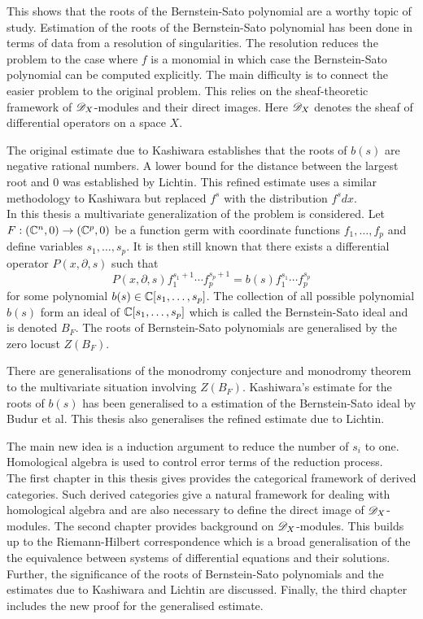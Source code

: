 This shows that the roots of the Bernstein-Sato polynomial are a worthy topic of study.
Estimation of the roots of the Bernstein-Sato polynomial has been done in terms of data from a resolution of singularities.
The resolution reduces the problem to the case where $f$ is a monomial in which case the Bernstein-Sato polynomial can be computed explicitly.
The main difficulty is to connect the easier problem to the original problem.
This relies on the sheaf-theoretic framework of $\mathscr{D}_X$-modules and their direct images.
Here $\mathscr{D}_X$ denotes the sheaf of differential operators on a space $X$.

The original estimate due to Kashiwara establishes that the roots of $b(s)$ are negative rational numbers.
A lower bound for the distance between the largest root and $0$ was established by Lichtin.
This refined estimate uses a similar methodology to Kashiwara but replaced $f^s$ with the distribution $f^s dx$.
\\

In this thesis a multivariate generalization of the problem is considered.
Let $F:(\mathbb{C}^{n},0)\to (\mathbb{C}^p,0)$ be a function germ with coordinate functions $f_1,\ldots, f_p$ and define variables $s_1,\ldots, s_p$.
It is then still known that there exists a differential operator $P(x,\partial, s)$ such that
$$P(x,\partial,s) f_1^{s_1 + 1}\cdots f_p^{s_p + 1} = b(s)f_1^{s_1}\cdots f_p^{s_p}$$
for some polynomial $b(s) \in \mathbb{C}[s_1,\ldots, s_p]$.
The collection of all possible polynomial $b(s)$ form an ideal of $\mathbb{C}[s_1,\ldots,s_p]$ which is called the Bernstein-Sato ideal and is denoted $B_{F}$.
The roots of Bernstein-Sato polynomials are generalised by the zero locust $Z(B_F)$.

There are generalisations of the monodromy conjecture and monodromy theorem to the multivariate situation involving $Z(B_F)$.
Kashiwara's estimate for the roots of $b(s)$ has been generalised to a estimation of the Bernstein-Sato ideal by Budur et al.
This thesis also generalises the refined estimate due to Lichtin.

The main new idea is a induction argument to reduce the number of $s_i$ to one.
Homological algebra is used to control error terms of the reduction process.
\\

The first chapter in this thesis gives provides the categorical framework of derived categories.
Such derived categories give a natural framework for dealing with homological algebra and are also necessary to define the direct image of $\mathscr{D}_X$-modules.
The second chapter provides background on $\mathscr{D}_X$-modules. This builds up to the Riemann-Hilbert correspondence which is a broad generalisation of the the equivalence between systems of differential equations and their solutions.
Further, the significance of the roots of Bernstein-Sato polynomials and the estimates due to Kashiwara and Lichtin are discussed.
Finally, the third chapter includes the new proof for the generalised estimate.
